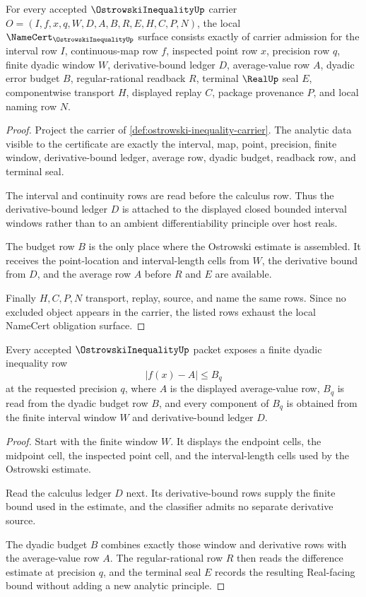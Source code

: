 \begin{theorem}
\label{thm:ostrowski-inequality-namecert-obligations}
For every accepted $\OstrowskiInequalityUp$ carrier $O=(I,f,x,q,W,D,A,B,R,E,H,C,P,N)$, the local $\NameCert_{\OstrowskiInequalityUp}$ surface consists exactly of carrier admission for the interval row $I$, continuous-map row $f$, inspected point row $x$, precision row $q$, finite dyadic window $W$, derivative-bound ledger $D$, average-value row $A$, dyadic error budget $B$, regular-rational readback $R$, terminal $\RealUp$ seal $E$, componentwise transport $H$, displayed replay $C$, package provenance $P$, and local naming row $N$.
\end{theorem}
\begin{proof}
Project the carrier of \autoref{def:ostrowski-inequality-carrier}. The analytic data visible to the certificate are exactly the interval, map, point, precision, finite window, derivative-bound ledger, average row, dyadic budget, readback row, and terminal seal.

The interval and continuity rows are read before the calculus row. Thus the derivative-bound ledger $D$ is attached to the displayed closed bounded interval windows rather than to an ambient differentiability principle over host reals.

The budget row $B$ is the only place where the Ostrowski estimate is assembled. It receives the point-location and interval-length cells from $W$, the derivative bound from $D$, and the average row $A$ before $R$ and $E$ are available.

Finally $H,C,P,N$ transport, replay, source, and name the same rows. Since no excluded object appears in the carrier, the listed rows exhaust the local NameCert obligation surface.
\end{proof}

\begin{theorem}
\label{thm:ostrowski-inequality-dyadic-error-bound}
Every accepted $\OstrowskiInequalityUp$ packet exposes a finite dyadic inequality row
$$
\left|f(x)-A\right|\leq B_q
$$
at the requested precision $q$, where $A$ is the displayed average-value row, $B_q$ is read from the dyadic budget row $B$, and every component of $B_q$ is obtained from the finite interval window $W$ and derivative-bound ledger $D$.
\end{theorem}
\begin{proof}
Start with the finite window $W$. It displays the endpoint cells, the midpoint cell, the inspected point cell, and the interval-length cells used by the Ostrowski estimate.

Read the calculus ledger $D$ next. Its derivative-bound rows supply the finite bound used in the estimate, and the classifier admits no separate derivative source.

The dyadic budget $B$ combines exactly those window and derivative rows with the average-value row $A$. The regular-rational row $R$ then reads the difference estimate at precision $q$, and the terminal seal $E$ records the resulting Real-facing bound without adding a new analytic principle.
\end{proof}

